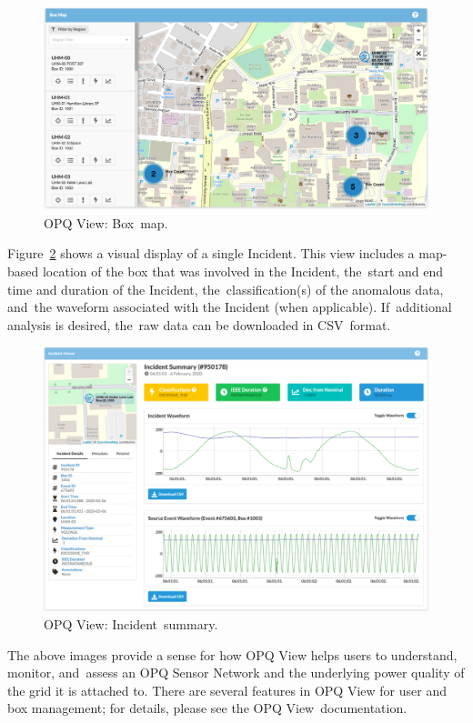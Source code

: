 \documentclass[energies,article,accept,moreauthors,pdftex]{Definitions/mdpi}
\begin{document}
\begin{figure}[H]
\center \includegraphics[width=5in]{images/view/boxmap-2.png}
\caption{OPQ View: Box~map.}
\label{fig:opq-view-box-map}
\end{figure}

Figure~\ref{fig:opq-view-incident-summary} shows a visual display of a single Incident. This view includes a map-based location of the box that was involved in the Incident, the~start and end time and duration of the Incident, the~classification(s) of the anomalous data, and~the waveform associated with the Incident (when applicable). If~additional analysis is desired, the~raw data can be downloaded in CSV~format.

\begin{figure}[H]
\center \includegraphics[width=5in]{images/view/incident-summary.png}
\caption{OPQ View: Incident~summary.}
\label{fig:opq-view-incident-summary}
\end{figure}

The above images provide a sense for how OPQ View helps users to understand, monitor, and~assess an OPQ Sensor Network and the underlying power quality of the grid it is attached to. There are several features in OPQ View for user and box management; for details, please see the OPQ View~documentation.
\end{document}
